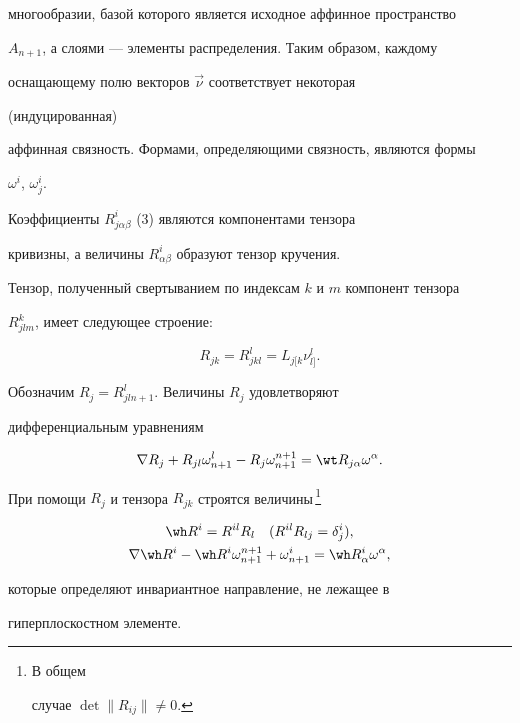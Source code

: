 многообразии, базой которого является исходное аффинное пространство 


$A_{n+1}$, а слоями --- элементы распределения. Таким образом, каждому 


оснащающему полю векторов $\Vec \nu$ соответствует некоторая 


(индуцированная) 


аффинная связность. Формами, определяющими связность, являются формы 


$\omega^i$, $\omega^i_j$. 


 


Коэффициенты $R^i_{j\alpha\beta}$ (3) являются компонентами тензора 


кривизны, а величины $R^i_{\alpha\beta}$ образуют тензор кручения. 


Тензор, полученный свертыванием по индексам $k$ и $m$ компонент тензора 


$R^k_{j l m}$, имеет следующее строение: 


$$ 


R_{j k}=R^l_{j k l}=L{}_{j[k}\nu{}^l_{l]}. 


$$ 


 


Обозначим $R_j=R^l_{j l n+1}$. Величины $R_j$ удовлетворяют 


дифференциальным уравнениям 


$$ 


\nabla R_j+R_{j l}\omega^l_{n+1}- 


R_j\omega^{n+1}_{n+1}=\wt R_{j\alpha}\omega^\alpha. 


$$ 


При помощи $R_j$ и тензора $R_{j k}$ строятся величины\,\footnote{В общем 


случае $\det\|R_{i j}\|\ne0$.} 


\begin{gather*} 


\wh R^i=R^{i l}R_l\quad (R^{i l}R_{l j}=\delta^i_j),\\ 


\nabla \wh R^i-\wh R^i\omega^{n+1}_{n+1} 


+\omega^i_{n+1}=\wh R^i_\alpha \omega^\alpha, 


\end{gather*} 


которые определяют инвариантное направление, не лежащее в 


гиперплоскостном элементе. 


